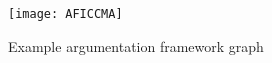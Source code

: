 \begin{figure}
	\texttt{[image: AFICCMA]}
	\caption{Example argumentation framework graph}
\end{figure}